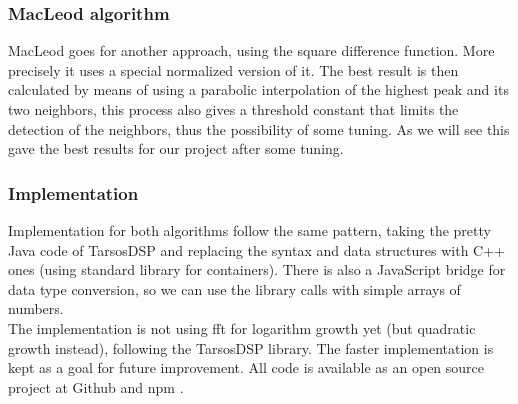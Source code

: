 \subsubsection{MacLeod algorithm}
MacLeod \cite{MacLeodArticle} goes for another approach, using the square difference
function. More precisely it uses a special normalized version of it. The best result
is then calculated by means of using a parabolic interpolation of the highest
peak and its two neighbors, this process also gives a threshold constant that limits
the detection of the neighbors, thus the possibility of some tuning. As we will
see this gave the best results for our project after some tuning.

\subsubsection{Implementation}
\label{pitch-detection-implementation}
Implementation for both algorithms follow the same pattern, taking the pretty
Java code of TarsosDSP \cite{TarsosDSP} and replacing the syntax and data structures
with C++ ones (using standard library for containers). There is also a JavaScript bridge
for data type conversion, so we can use the library calls with simple arrays of numbers.\\
The implementation is not using fft for logarithm growth yet (but quadratic growth
instead), following the TarsosDSP library. The faster implementation is kept as
a goal for future improvement. All code is available as an open source project at
Github and npm \cite{node-pitchfinder}.
